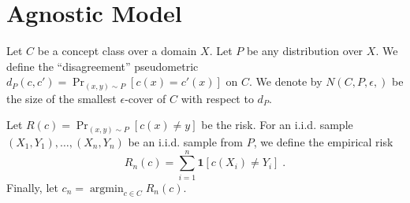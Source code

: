 \documentclass[12pt]{article}
\newcommand{\indicator}[1]{\mathbf{1}\left[{#1}\right]}
\DeclareMathOperator{\argmin}{argmin}
\begin{document}
\section{Agnostic Model}

Let $C$ be a concept class over a domain $X$. Let $P$ be any distribution over
$X$. We define the ``disagreement'' pseudometric $d_P(c,c') = \Pr_{(x,y) \sim
P}[c(x) = c'(x)]$ on $C$. We denote by $N(C,P,\epsilon,)$ be the size of the
smallest $\epsilon$-cover of $C$ with respect to $d_P$.

Let $R(c) = \Pr_{(x,y) \sim P}[c(x) \neq y]$ be the risk.
For an i.i.d. sample $(X_1, Y_1), \dots, (X_n, Y_n)$ be an i.i.d. sample
from $P$, we define the empirical risk
$$
R_n(c) = \sum_{i=1}^n \indicator{c(X_i) \neq Y_i} \; .
$$
Finally, let $c_n = \argmin_{c \in C} R_n(c)$.



\end{document}
